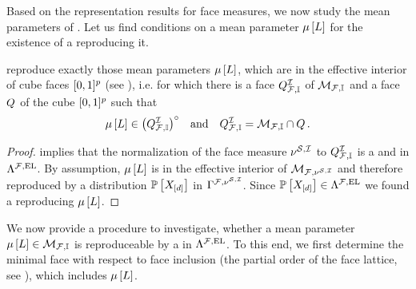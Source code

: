 Based on the representation results for face measures, we now study the mean parameters of \HybridLogicNetworks{}.
Let us find conditions on a mean parameter $\mu\left[L\right]$ for the existence of a \HybridLogicNetwork{} reproducing it. %

\begin{theorem}
    \label{the:hlnInteriorCharacterization}
    \HybridLogicNetworks{} reproduce exactly those mean parameters $\mu\left[L\right]$, which are in the effective interior of cube faces $[0,1]^{p}$ (see ), i.e. for which there is a face $Q^{\mathcal{I}}_{\mathcal{F},\mathbb{I}}$ of $\mathcal{M}_{\mathcal{F},\mathbb{I}}$ and a face $Q$ of the cube $[0,1]^{p}$ such that
    \begin{align*}
        \mu\left[L\right]\in{\left(Q^{\mathcal{I}}_{\mathcal{F},\mathbb{I}}\right)}^{\circ} \quad\text{and}\quad Q^{\mathcal{I}}_{\mathcal{F},\mathbb{I}} = \mathcal{M}_{\mathcal{F},\mathbb{I}}\cap Q \, .
    \end{align*}
\end{theorem}
\begin{proof}
     implies that the normalization of the face measure $\nu^{\mathcal{S},\mathcal{I}}$ to $Q^{\mathcal{I}}_{\mathcal{F},\mathbb{I}}$ is a \HardLogicNetwork{} and in $\Lambda^{\mathcal{F},\mathrm{EL}}$.
    By assumption, $\mu\left[L\right]$ is in the effective interior of $\mathcal{M}_{\mathcal{F},\nu^{\mathcal{S},\mathcal{I}}}$ and therefore reproduced by a distribution $\mathbb{P}\left[X_{[d]}\right]$ in $\Gamma^{\mathcal{F},\nu^{\mathcal{S},\mathcal{I}}}$.
    Since $\mathbb{P}\left[X_{[d]}\right]\in\Lambda^{\mathcal{F},\mathrm{EL}}$ we found a \HybridLogicNetwork{} reproducing $\mu\left[L\right]$.
\end{proof}

We now provide a procedure to investigate, whether a mean parameter $\mu\left[L\right]\in\mathcal{M}_{\mathcal{F},\mathbb{I}}$ is reproduceable by a \HybridLogicNetwork{} in $\Lambda^{\mathcal{F},\mathrm{EL}}$.
To this end, we first determine the minimal face with respect to face inclusion (the partial order of the face lattice, see \cite{ziegler_lectures_2013}), which includes $\mu\left[L\right]$.

